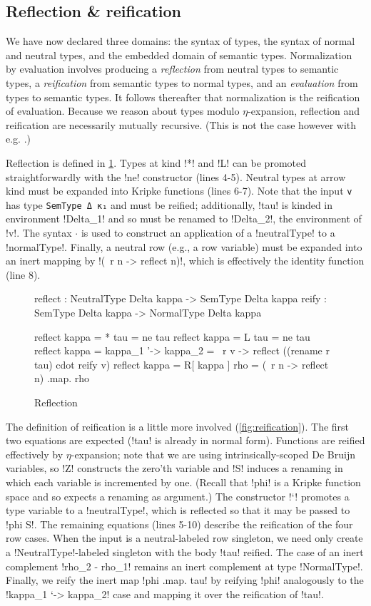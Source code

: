 \documentclass[sigplan,10pt,anonymous,review]{acmart}\settopmatter{printfolios=true,printccs=false,printacmref=false}
\begin{document}
\subsection{Reflection \& reification}

We have now declared three domains: the syntax of types, the syntax of normal and neutral types, and the embedded domain of semantic types. Normalization by evaluation involves producing a \emph{reflection} from neutral types to semantic types, a \emph{reification} from semantic types to normal types, and an \emph{evaluation} from types to semantic types. It follows thereafter that normalization is the reification of evaluation. Because we reason about types modulo $\eta$-expansion, reflection and reification are necessarily mutually recursive. (This is not the case however with e.g. \citet{ChapmanKNW19}.)

Reflection is defined in \cref{fig:reflection}. Types at kind !*! and !L! can be promoted straightforwardly with the !ne! constructor (lines 4-5). Neutral types at arrow kind must be expanded into Kripke functions (lines 6-7). Note that the input \verb!v! has type \verb!SemType Δ κ₁! and must be reified; additionally, !tau! is kinded in environment !Delta_1! and so must be renamed to !Delta_2!, the environment of !v!. The syntax $\cdot$ is used to construct an application of a !neutralType! to a !normalType!. Finally, a neutral row (e.g., a row variable) must be expanded into an inert mapping by !(\ r n -> reflect n)!, which is effectively the identity function (line 8). 
\begin{figure}
\begin{agda}
reflect : NeutralType Delta kappa -> SemType Delta kappa 
reify : SemType Delta kappa -> NormalType Delta kappa

reflect {kappa = *} tau = ne tau
reflect {kappa = L} tau = ne tau
reflect {kappa = kappa_1 '-> kappa_2} = 
  \ r v -> reflect ((rename r tau) cdot reify v)
reflect {kappa = R[ kappa ]} rho = (\ r n -> reflect n) .map. rho
\end{agda}
\caption{Reflection}
\label{fig:reflection}
\end{figure}

The definition of reification is a little more involved (\cref{fig:reification}). The first two equations are expected (!tau! is already in normal form). Functions are reified effectively by $\eta$\--expan\-sion; note that we are using intrinsically-scoped De Bruijn variables, so !Z! constructs the zero'th variable and !S! induces a renaming in which each variable is incremented by one. (Recall that !phi! is a Kripke function space and so expects a renaming as argument.) The constructor !`! promotes a type variable to a !neutralType!, which is reflected so that it may be passed to !phi S!. The remaining equations (lines 5-10) describe the reification of the four row cases. When the input is a neutral-labeled row singleton, we need only create a !NeutralType!-labeled singleton with the body !tau! reified. The case of an inert complement !rho_2 - rho_1! remains an inert complement at type !NormalType!. Finally, we reify the inert map !phi .map. tau! by reifying !phi! analogously to the !kappa_1 `-> kappa_2! case and mapping it over the reification of !tau!.
\end{document}
